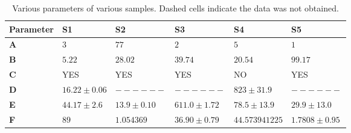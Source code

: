 \begin{table}[ht!]
    \centering
    \begin{tabular}{ p{3.7cm} || p{2.5cm} | p{2.5cm} | p{2.5cm} | p{2.5cm} | p{2.5cm}}
        \textbf{Parameter} & \textbf{S1} & \textbf{S2} & \textbf{S3} & \textbf{S4} & \textbf{S5} \\
        \hline
        \textbf{A} & $3$ & 
        $77$ & $2$ & $5$ & $1$ \\ \hline
        \textbf{B} & $5.22$ & $28.02$ & $39.74$ & $20.54$ & $99.17$ \\ \hline
        \textbf{C} & YES & YES & YES & NO & YES \\ \hline
        \textbf{D} & $16.22 \pm 0.06$ & $------$ & $------$ & $823 \pm 31.9$ & $------$ \\ \hline
        \textbf{E} & $44.17 \pm 2.6$ & $13.9 \pm 0.10$ & $611.0 \pm 1.72$ & $78.5 \pm 13.9$ & $29.9 \pm 13.0$ \\ \hline
        \textbf{F} & $89$ & $1.054369$ & $36.90 \pm 0.79$ & $44.573941225$ & $1.7808 \pm 0.95$ \\ 
    \end{tabular}
    \caption{Various parameters of various samples. Dashed cells indicate the data was not obtained.}\label{tab:TABLE}
\end{table}